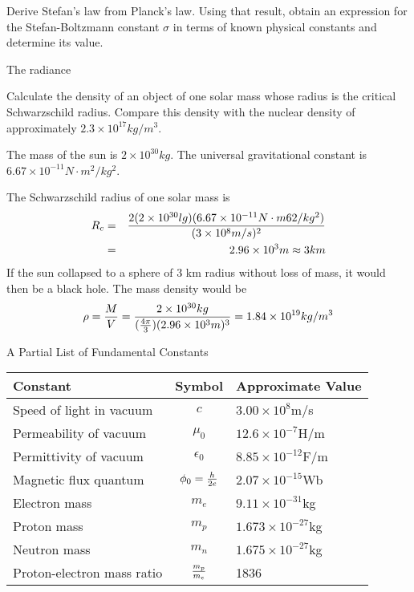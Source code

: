 \documentclass[10pt, onekey]{examdesign}
\begin{document}
\begin{shortanswer}[title={\Large Short Answer (10 pts each)},suppressprefix]
\begin{question}
  Derive Stefan's law from Planck's law.  Using that result, obtain an
  expression for the Stefan-Boltzmann constant $\sigma$ in terms of known
  physical constants and determine its value.
  \examvspace*{1.5in}
  \begin{answer}
    The radiance
  \end{answer}
\end{question}

\begin{question}
  Calculate the density of an object of one solar mass whose radius is the
  critical Schwarzschild radius.  Compare this density with the nuclear
  density of approximately $2.3 \times 10^{17} kg/m^3$.
  \examvspace*{1.5in}
  \begin{answer}
    The mass of the sun is $2 \times 10^{30} kg$. The universal gravitational
    constant is $6.67 \times 10^{-11} N\cdot m^2/kg^2$.

    The Schwarzschild radius of one solar mass is
    \begin{eqnarray*}
    R_c & = & {2(2 \times 10^{30}lg)(6.67 \times 10^{-11} N\cdot m62/kg^2)
              \over (3 \times 10^8 m/s)^2} \\
        & = & 2.96 \times 10^3 m \approx 3 km
    \end{eqnarray*}
    If the sun collapsed to a sphere of 3 km radius without loss of mass, it
    would then be a black hole. The mass density would be
    \[
    \rho = {M \over V} = {2 \times 10^{30} kg \over ({4\pi \over 3})
                         (2.96 \times 10^3 m)^3} = 1.84 \times 10^{19} kg/m^3
    \]
  \end{answer}
\end{question}
\end{shortanswer}

\begin{endmatter}
  \vspace*{1.5in}
  \centerline{\Large A Partial List of Fundamental Constants}
  \bigskip
  \begin{center}
  \begin{tabular}{lcl}
    Constant & Symbol & Approximate Value \\ \hline
    Speed of light in vacuum & $c$ & $3.00 \times 10^8$m/s \\
    Permeability of vacuum & $\mu_0$ & $12.6 \times 10^{-7}$H/m \\
    Permittivity of vacuum & $\epsilon_0$ & $8.85 \times 10^{-12}$F/m \\
    Magnetic flux quantum & $\phi_0 = {h \over 2e}$ & $2.07 \times 10^{-15}$Wb \\
    Electron mass & $m_e$ & $9.11 \times 10^{-31}$kg \\
    Proton mass & $m_p$ & $1.673 \times 10^{-27}$kg \\
    Neutron mass & $m_n$ & $1.675 \times 10^{-27}$kg \\
    Proton-electron mass ratio & $m_p \over m_e$ & 1836
  \end{tabular}
  \end{center}
\end{endmatter}
\end{document}
